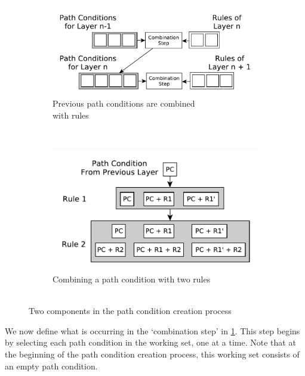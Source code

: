 \begin{figure}[htb]
        \centering
        \begin{subfigure}[b]{0.34\textwidth}
                \centering
                \includegraphics[width=1\textwidth]{./figures/building_path_conditions/next_layer.pdf}
                \caption{Previous path conditions are combined\\ with rules}
                \label{fig:next_layer}
        \end{subfigure}%
        ~~
        \begin{subfigure}[b]{0.34\textwidth}
                \centering
                \includegraphics[width=1\textwidth]{./figures/overview/layers_pc.pdf}
                \caption{Combining a path condition with two rules\\~}
                \label{fig:layers_pc2}
        \end{subfigure}%
        
       
         \caption{Two components in the path condition creation process}
         \label{fig:combining_path_conditions}
\end{figure}

We now define what is occurring in the `combination step' in \cref{fig:next_layer}. This step begins by selecting each path condition in the working set, one at a time. Note that at the beginning of the path condition creation process, this working set consists of an empty path condition.

